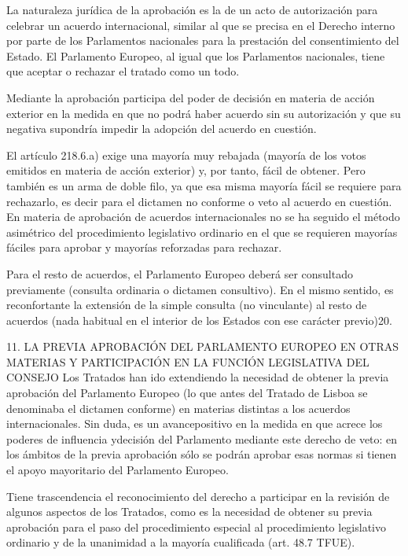 \documentclass[10pt,a4paper]{article}
\begin{document}
La naturaleza jurídica de la aprobación es la de un acto de autorización para celebrar un acuerdo internacional, similar al que se precisa en el Derecho interno por parte de los Parlamentos nacionales para la prestación del consentimiento del Estado. El Parlamento Europeo, al igual que los Parlamentos nacionales, tiene que aceptar o rechazar el tratado como un todo.

Mediante la aprobación participa del poder de decisión en materia de acción exterior en la medida en que no podrá haber acuerdo sin su autorización y que su negativa supondría impedir la adopción del acuerdo en cuestión.

El artículo 218.6.a) exige una mayoría muy rebajada (mayoría de los votos emitidos en materia de acción exterior) y, por tanto, fácil de obtener. Pero también es un arma de doble filo, ya que esa misma mayoría fácil se requiere para rechazarlo, es decir para el dictamen no conforme o veto al acuerdo en cuestión. En materia de aprobación de acuerdos internacionales no se ha seguido el método asimétrico del procedimiento legislativo ordinario en el que se requieren mayorías fáciles para aprobar y mayorías reforzadas para rechazar.

Para el resto de acuerdos, el Parlamento Europeo deberá ser consultado previamente (consulta ordinaria o dictamen consultivo). En el mismo sentido, es reconfortante la extensión de la simple consulta (no vinculante) al resto de acuerdos (nada habitual en el interior de los Estados con ese carácter previo)20.


11. LA PREVIA APROBACIÓN DEL PARLAMENTO
EUROPEO EN OTRAS MATERIAS Y
PARTICIPACIÓN EN LA FUNCIÓN LEGISLATIVA
DEL CONSEJO
Los Tratados han ido extendiendo la necesidad de obtener la previa aprobación del Parlamento Europeo (lo que antes del Tratado de Lisboa se denominaba el dictamen conforme) en materias distintas a los acuerdos internacionales. Sin duda, es un avancepositivo en la medida en que acrece los poderes de influencia ydecisión del Parlamento mediante este derecho de veto: en los ámbitos de la previa aprobación sólo se podrán aprobar esas normas si tienen el apoyo mayoritario del Parlamento Europeo.

Tiene trascendencia el reconocimiento del derecho a participar en  la revisión de algunos aspectos de los Tratados, como es la necesidad de obtener su previa aprobación para el paso del procedimiento especial al procedimiento legislativo ordinario y de la unanimidad a la mayoría cualificada (art. 48.7 TFUE).
\end{document}
